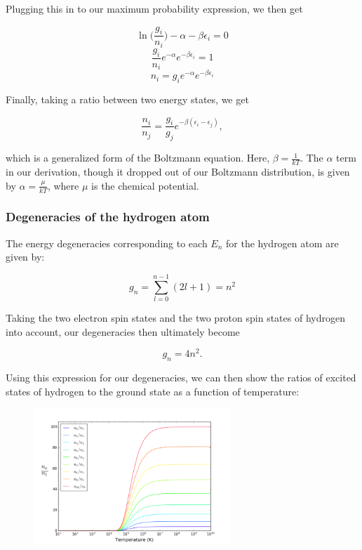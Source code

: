 \documentclass{article}
\begin{document}
Plugging this in to our maximum probability expression, we then get

$$ \ln\Big(\frac{g_i}{n_i}\Big) - \alpha - \beta\epsilon_i = 0 $$
$$ \frac{g_i}{n_i}e^{-\alpha}e^{-\beta\epsilon_i} = 1 $$
$$ n_i = g_i e^{-\alpha}e^{-\beta\epsilon_i} $$

Finally, taking a ratio between two energy states, we get

$$ \frac{n_i}{n_j} = \frac{g_i}{g_j}e^{-\beta(\epsilon_i - \epsilon_j)}, $$

which is a generalized form of the Boltzmann equation. Here, $\beta = \frac{1}{kT}$. The $\alpha$ term in our derivation, though it dropped out of our Boltzmann distribution, is given by $\alpha = \frac{\mu}{kT}$, where $\mu$ is the chemical potential.

\subsubsection{Degeneracies of the hydrogen atom}

The energy degeneracies corresponding to each $E_n$ for the hydrogen atom are given by:

\begin{equation}
g_n = \sum^{n-1}_{l=0} (2l + 1) = n^2
\end{equation}

Taking the two electron spin states and the two proton spin states of hydrogen into account, our degeneracies then ultimately become

\begin{equation}
g_n = 4n^2.
\end{equation}

Using this expression for our degeneracies, we can then show the ratios of excited states of hydrogen to the ground state as a function of temperature:

\begin{figure}[ht]
    \centering
    \includegraphics[width=0.66\textwidth]{figures/boltzmann.png}
    \caption{}
    \label{fig:Boltzmann}
\end{figure}
\end{document}
